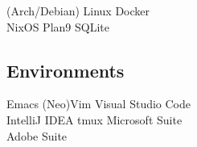 \documentclass[letterpaper]{deedy-resume} %
\begin{document}
\begin{minipage}[t]{0.33\textwidth}
(Arch/Debian) Linux  \textbullet{} Docker  \\

NixOS \textbullet{} Plan9 \textbullet{} SQLite \\

\sectionspace %

\subsection{Environments}

Emacs \textbullet{} (Neo)Vim \textbullet{} Visual Studio Code \\
\textbullet{} IntelliJ IDEA \textbullet{} tmux \textbullet{} Microsoft Suite \\
\textbullet{} Adobe Suite

\end{minipage} %
\hfill
%
%
\end{document}
